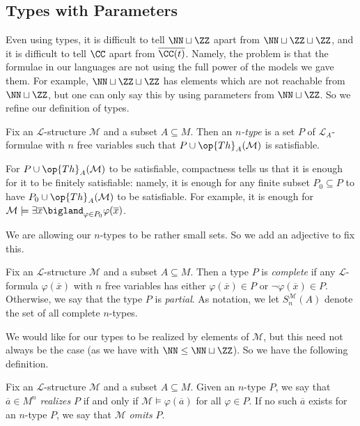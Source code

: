 \documentclass[../notes.tex]{subfiles}
\begin{document}
\subsection{Types with Parameters}
Even using types, it is difficult to tell $\NN\sqcup\ZZ$ apart from $\NN\sqcup\ZZ\sqcup\ZZ$, and it is difficult to tell $\CC$ apart from $\overline{\CC(t)}$. Namely, the problem is that the formulae in our languages are not using the full power of the models we gave them. For example, $\NN\sqcup\ZZ\sqcup\ZZ$ has elements which are not reachable from $\NN\sqcup\ZZ$, but one can only say this by using parameters from $\NN\sqcup\ZZ$. So we refine our definition of types.
\begin{definition}[type]
	Fix an $\mathcal L$-structure $\mathcal M$ and a subset $A\subseteq M$. Then an \textit{$n$-type} is a set $P$ of $\mathcal L_A$-formulae with $n$ free variables such that $P\cup\op{Th}_A(\mathcal M)$ is satisfiable.
\end{definition}
\begin{remark}
	For $P\cup\op{Th}_A(\mathcal M)$ to be satisfiable, compactness tells us that it is enough for it to be finitely satisfiable: namely, it is enough for any finite subset $P_0\subseteq P$ to have $P_0\cup\op{Th}_A(\mathcal M)$ to be satisfiable. For example, it is enough for $\mathcal M\models\exists\overline x\bigland_{\varphi\in P_0}\varphi(\overline x)$.
\end{remark}
We are allowing our $n$-types to be rather small sets. So we add an adjective to fix this.
\begin{definition}[complete]
	Fix an $\mathcal L$-structure $\mathcal M$ and a subset $A\subseteq M$. Then a type $P$ is \textit{complete} if any $\mathcal L$-formula $\varphi(\overline x)$ with $n$ free variables has either $\varphi(\overline x)\in P$ or $\lnot\varphi(\overline x)\in P$. Otherwise, we say that the type $P$ is \textit{partial}. As notation, we let $S_n^{\mathcal M}(A)$ denote the set of all complete $n$-types.
\end{definition}
We would like for our types to be realized by elements of $\mathcal M$, but this need not always be the case (as we have with $\NN\le\NN\sqcup\ZZ$). So we have the following definition.
\begin{definition}[realizes]
	Fix an $\mathcal L$-structure $\mathcal M$ and a subset $A\subseteq M$. Given an $n$-type $P$, we say that $\overline a\in M^n$ \textit{realizes} $P$ if and only if $\mathcal M\models\varphi(\overline a)$ for all $\varphi\in P$. If no such $\overline a$ exists for an $n$-type $P$, we say that $\mathcal M$ \textit{omits} $P$.
\end{definition}
\end{document}
